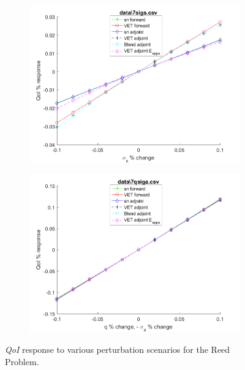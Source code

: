 \documentclass[12pt]{report}
\newcommand{\qoi}{{\it QoI}\xspace}
\begin{document}
\begin{figure}[H]
\begin{subfigure}{.5\textwidth}
  \includegraphics[width=.98\linewidth]{figures2/7sigsSens.png}
  \label{T4:sfig3}
\end{subfigure}%
\begin{subfigure}{.5\textwidth}
  \centering
  \includegraphics[width=.98\linewidth]{figures2/7qsigaSens.png}
  \label{T4:sfig4}
\end{subfigure}
\caption{\qoi response to various perturbation scenarios for the Reed Problem.}
\end{figure}
\end{document}
